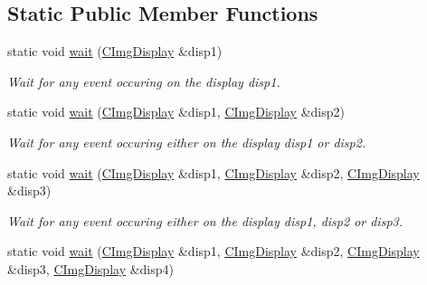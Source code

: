 \subsection*{Static Public Member Functions}
\begin{DoxyCompactItemize}
\item 
\hypertarget{structcimg__library_1_1_c_img_display_a8c2bf618661c56a0738ffdfa8f59e247}{
static void \hyperlink{structcimg__library_1_1_c_img_display_a8c2bf618661c56a0738ffdfa8f59e247}{wait} (\hyperlink{structcimg__library_1_1_c_img_display}{CImgDisplay} \&disp1)}
\label{structcimg__library_1_1_c_img_display_a8c2bf618661c56a0738ffdfa8f59e247}

\begin{DoxyCompactList}\small\item\em Wait for any event occuring on the display {\ttfamily disp1}. \item\end{DoxyCompactList}\item 
\hypertarget{structcimg__library_1_1_c_img_display_af9d487817a273facc7e0152c2a9b03e8}{
static void \hyperlink{structcimg__library_1_1_c_img_display_af9d487817a273facc7e0152c2a9b03e8}{wait} (\hyperlink{structcimg__library_1_1_c_img_display}{CImgDisplay} \&disp1, \hyperlink{structcimg__library_1_1_c_img_display}{CImgDisplay} \&disp2)}
\label{structcimg__library_1_1_c_img_display_af9d487817a273facc7e0152c2a9b03e8}

\begin{DoxyCompactList}\small\item\em Wait for any event occuring either on the display {\ttfamily disp1} or {\ttfamily disp2}. \item\end{DoxyCompactList}\item 
\hypertarget{structcimg__library_1_1_c_img_display_a0e800e61def1cc90892386890c691330}{
static void \hyperlink{structcimg__library_1_1_c_img_display_a0e800e61def1cc90892386890c691330}{wait} (\hyperlink{structcimg__library_1_1_c_img_display}{CImgDisplay} \&disp1, \hyperlink{structcimg__library_1_1_c_img_display}{CImgDisplay} \&disp2, \hyperlink{structcimg__library_1_1_c_img_display}{CImgDisplay} \&disp3)}
\label{structcimg__library_1_1_c_img_display_a0e800e61def1cc90892386890c691330}

\begin{DoxyCompactList}\small\item\em Wait for any event occuring either on the display {\ttfamily disp1}, {\ttfamily disp2} or {\ttfamily disp3}. \item\end{DoxyCompactList}\item 
\hypertarget{structcimg__library_1_1_c_img_display_a3b25b3b7b2d3021c4ce57174e423e6f3}{
static void \hyperlink{structcimg__library_1_1_c_img_display_a3b25b3b7b2d3021c4ce57174e423e6f3}{wait} (\hyperlink{structcimg__library_1_1_c_img_display}{CImgDisplay} \&disp1, \hyperlink{structcimg__library_1_1_c_img_display}{CImgDisplay} \&disp2, \hyperlink{structcimg__library_1_1_c_img_display}{CImgDisplay} \&disp3, \hyperlink{structcimg__library_1_1_c_img_display}{CImgDisplay} \&disp4)}
\label{structcimg__library_1_1_c_img_display_a3b25b3b7b2d3021c4ce57174e423e6f3}


\end{DoxyCompactItemize}
